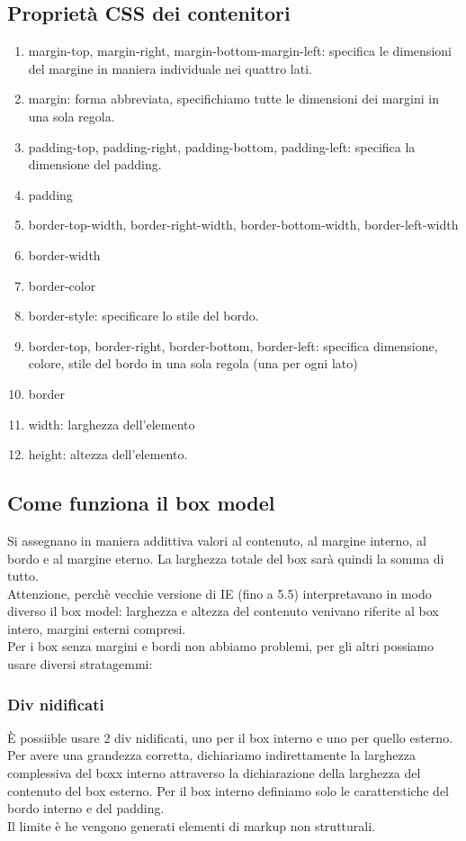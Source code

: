 \documentclass{article}
\begin{document}
\subsection{Proprietà CSS dei contenitori}
\begin{enumerate}
	\item margin-top, margin-right, margin-bottom-margin-left: specifica le dimensioni del margine in maniera individuale nei quattro lati.
	\item margin: forma abbreviata, specifichiamo tutte le dimensioni dei margini in una sola regola.
	\item padding-top, padding-right, padding-bottom, padding-left: specifica la dimensione del padding.
	\item padding
	\item border-top-width, border-right-width, border-bottom-width, border-left-width
	\item border-width
	\item border-color
	\item border-style: specificare lo stile del bordo.
	\item border-top, border-right, border-bottom, border-left: specifica dimensione, colore, stile del bordo in una sola regola (una per ogni lato)
	\item border
	\item width: larghezza dell'elemento
	\item height: altezza dell'elemento.
\end{enumerate}
\subsection{Come funziona il box model}
Si assegnano in maniera addittiva valori al contenuto, al margine interno, al bordo e al margine eterno. La larghezza totale del box sarà quindi la somma di tutto.\\
Attenzione, perchè vecchie versione di IE (fino a 5.5) interpretavano in modo diverso il box model: larghezza e altezza del contenuto venivano riferite al box intero, margini esterni compresi.\\
Per i box senza margini e bordi non abbiamo problemi, per gli altri possiamo usare diversi stratagemmi:
\subsubsection{Div nidificati}
È possiible usare 2 div nidificati, uno per il box interno e uno per quello esterno.\\
Per avere una grandezza corretta, dichiariamo indirettamente la larghezza complessiva del boxx interno attraverso la dichiarazione della larghezza del contenuto del box esterno. Per il box interno definiamo solo le caratterstiche del bordo interno e del padding.\\
Il limite è he vengono generati elementi di markup non strutturali.
\end{document}
